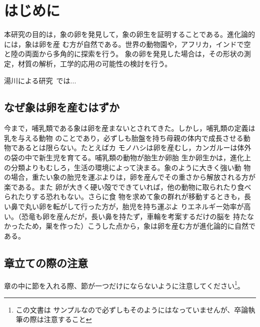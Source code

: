 \chapter{はじめに}
本研究の目的は，象の卵を発見して，象の卵生を証明することである。進化論的には，象は卵を産
む方が自然である。世界の動物園や，アフリカ，インドで空と陸の両面から多角的に探索を行う。
象の卵を発見した場合は，その形状の測定，材質の解析，工学的応用の可能性の検討を行う。

湯川による研究~\cite{yukawa1950quantum}では...

\section{なぜ象は卵を産むはずか}
今まで，哺乳類である象は卵を産まないとされてきた。しかし，哺乳類の定義は乳を与える動物
のことであり，必ずしも胎盤を持ち母親の体内で成長させる動物であるとは限らない。たとえばカ
モノハシは卵を産むし，カンガルーは体外の袋の中で新生児を育てる。哺乳類の動物が胎生か卵胎
生か卵生かは，進化上の分類よりもむしろ，生活の環境によって決まる。象のように大きく強い動
物の場合，重たい象の胎児を運ぶよりは，卵を産んでその重さから解放される方が楽である。また
卵が大きく硬い殻でできていれば，他の動物に取られたり食べられたりする恐れもない。さらに食
物を求めて象の群れが移動するときも，長い鼻で丸い卵を転がして行った方が，胎児を持ち運ぶよ
りエネルギー効率が高い。（恐竜も卵を産んだが，長い鼻を持たず，車輪を考案するだけの脳を
持たなかったため，巣を作った）こうした点から，象は卵を産む方が進化論的に自然である。

\section{章立ての際の注意}
章の中に節を入れる際、節が一つだけにならないように注意してください\footnote{この文書は
サンプルなので必ずしもそのようにはなっていませんが、卒論執筆の際は注意すること}。